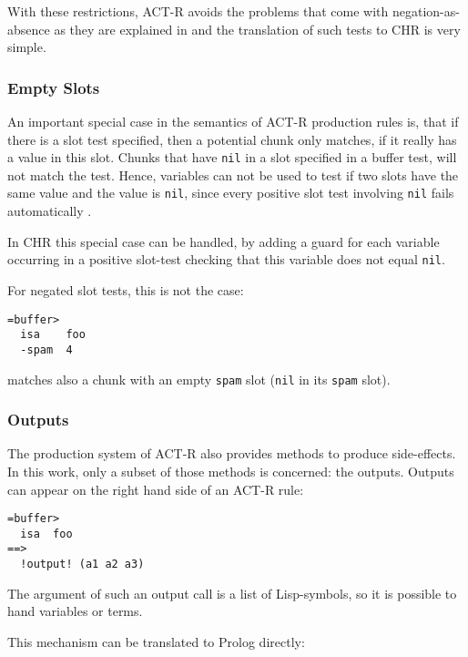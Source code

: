 With these restrictions, ACT-R avoids the problems that come with negation-as-absence as they are explained in \cite[147\psqq]{fru_chr_book_2009} and the translation of such tests to CHR is very simple.

\subsubsection{Empty Slots}

An important special case in the semantics of ACT-R production rules is, that if there is a slot test specified, then a potential chunk only matches, if it really has a value in this slot. Chunks that have \verb|nil| in a slot specified in a buffer test, will not match the test. Hence, variables can not be used to test if two slots have the same value and the value is \verb|nil|, since every positive slot test involving \verb|nil| fails automatically \cite[p. 164, section ``Variables'', last sentence]{actr_reference}.

In CHR this special case can be handled, by adding a guard for each variable occurring in a positive slot-test checking that this variable does not equal \verb|nil|.

For negated slot tests, this is not the case: 

\begin{lstlisting}
=buffer>
  isa    foo
  -spam  4
\end{lstlisting}

matches also a chunk with an empty \verb|spam| slot (\verb|nil| in its \verb|spam| slot).



\subsubsection{Outputs}

The production system of ACT-R also provides methods to produce side-effects. In this work, only a subset of those methods is concerned: the outputs. Outputs can appear on the right hand side of an ACT-R rule:

\begin{lstlisting}
=buffer>
  isa  foo
==>
  !output! (a1 a2 a3)
\end{lstlisting}

The argument of such an output call is a list of Lisp-symbols, so it is possible to hand variables or terms.

This mechanism can be translated to Prolog directly:

